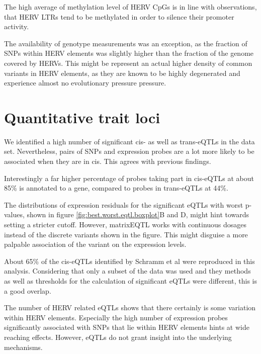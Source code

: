 \documentclass[a4paper,12pt,twoside,openright]{report}
\begin{document}
The high average of methylation level of HERV CpGs is in line with observations, that HERV LTRs tend to be methylated in order to silence their promoter activity\cite{Smith2013}.

The availability of genotype measurements was an exception, as the fraction of SNPs within HERV elements was slightly higher than the fraction of the genome covered by HERVs. This might be represent an actual higher density of common variants in HERV elements, as they are known to be highly degenerated and experience almost no evolutionary pressure pressure\cite{10.1146/annurev.genom.7.080505.115700}.

\section{Quantitative trait loci}
\label{Discussion:Quantitative trait loci}
We identified a high number of significant cis- as well as trans-eQTLs in the data set. Nevertheless, pairs of SNPs and expression probes are a lot more likely to be associated when they are in cis. This agrees with previous findings\cite{Joehanes2017}.

Interestingly a far higher percentage of probes taking part in cis-eQTLs at about 85\% is annotated to a gene, compared to probes in trans-eQTLs at 44\%. %
 
The distributions of expression residuals for the significant eQTLs with worst p-values, shown in figure \ref{fig:best.worst.eqtl.boxplot}B and D, might hint towards setting a stricter cutoff. However, matrixEQTL works with continuous dosages instead of the discrete variants shown in the figure. This might disguise a more palpable association of the variant on the expression levels.

About 65\% of the cis-eQTLs identified by Schramm et al\cite{Schramm2014} were reproduced in this analysis. Considering that only a subset of the data was used and they methods as well as thresholds for the calculation of significant eQTLs were different, this is a good overlap. 

The number of HERV related eQTLs shows that there certainly is some variation within HERV elements. Especially the high number of expression probes significantly associated with SNPs that lie within HERV elements hints at wide reaching effects. However, eQTLs do not grant insight into the underlying mechanisms. 
\end{document}

